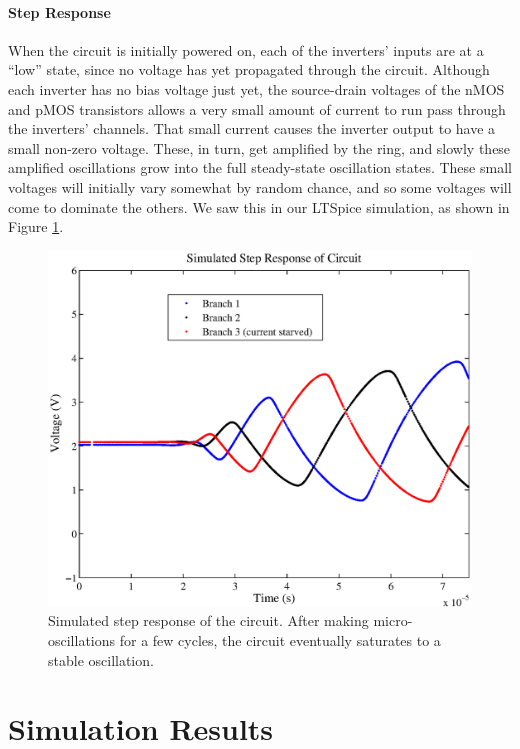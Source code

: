 \documentclass{article}
\begin{document}
\paragraph{Step Response}

When the circuit is initially powered on, each of the inverters' inputs are at a ``low'' state, since no voltage has yet propagated through the circuit.  Although each inverter has no bias voltage just yet, the source-drain voltages of the nMOS and pMOS transistors allows a very small amount of current to run pass through the inverters' channels. That small current causes the inverter output to have a small non-zero voltage. These, in turn, get amplified by the ring, and slowly these amplified oscillations grow into the full steady-state oscillation states.  These small voltages will initially vary somewhat by random chance, and so some voltages will come to dominate the others.  We saw this in our LTSpice simulation, as shown in Figure \ref{step}.

\begin{figure}[H]	
\centering			
\includegraphics[scale=.6]{step.eps}
\caption{Simulated step response of the circuit. After making micro-oscillations for a few cycles, the circuit eventually saturates to a stable oscillation.}
\label{step}		
\end{figure} 	

\section*{Simulation Results}
\end{document}
